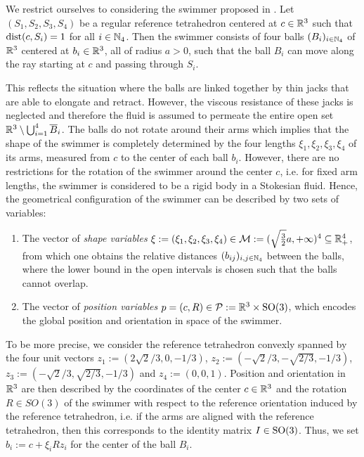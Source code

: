 \label{sec:modeling}
We restrict ourselves to considering the swimmer \spr proposed in \cite{Alouges2013}. Let $(S_1, S_2, S_3, S_4)$ be a regular reference tetrahedron centered at $c \in \mathbb{R}^3$ such that $\operatorname{dist}(c, S_i) = 1$ for all $i \in \mathbb{N}_4$. Then the swimmer consists of four balls $(B_i)_{i \in \mathbb{N}_4}$ of $\mathbb{R}^3$ centered at $b_i \in \mathbb{R}^3$, all of radius $a > 0$, such that the ball $B_i$ can move along the ray starting at $c$ and passing through $S_i$.

 This reflects the situation where the balls are linked together by thin jacks that are able to elongate and retract. However, the viscous resistance of these jacks is neglected and therefore the fluid is assumed to permeate the entire open set $\mathbb{R}^3 \setminus \bigcup_{i = 1}^{4} \overline{B}_i$. The balls do not rotate around their arms which implies that the shape of the swimmer is completely determined by the four lengths $\xi_1, \xi_2, \xi_3, \xi_4$ of its arms, measured from $c$ to the center of each ball $b_i$. However, there are no restrictions for the rotation of the swimmer around the center $c$, i.e. for fixed arm lengths, the swimmer is considered to be a rigid body in a Stokesian fluid.
Hence, the geometrical configuration of the swimmer can be described by two sets of variables:
\begin{enumerate}
	\item The vector of \emph{shape variables} $\xi := (\xi_1, \xi_2, \xi_3, \xi_4) \in \mathcal{M} := (\sqrt{\tfrac{3}{2}}a, +\infty)^4 \subseteq \mathbb{R}_+^4$, from which one obtains the relative distances $(b_{ij})_{i,j \in \mathbb{N}_4}$ between the balls,  where the lower bound in the open intervals is chosen such that the balls cannot overlap.
	\item The vector of \emph{position variables} $p = (c, R) \in \mathcal{P} :=  \mathbb{R}^3 \times \operatorname{SO}(3)$, which encodes the global position and orientation in space of the swimmer.
\end{enumerate}
To be more precise, we consider the reference tetrahedron convexly spanned by the four unit vectors $z_1 := (2 \sqrt{2}/3,0,-1/3)$, $z_2 := (-\sqrt{2}/3,-\sqrt{2/3},-1/3)$, $z_3 := (-\sqrt{2}/3,\sqrt{2/3},-1/3)$ and $z_4 := (0,0,1)$. Position and orientation in $\mathbb{R}^3$ are then described by the coordinates of the center $c \in \mathbb{R}^3$ and the rotation $R \in SO(3)$ of the swimmer with respect to the reference orientation induced by the reference tetrahedron, i.e. if the arms are aligned with the reference tetrahedron, then this corresponds to the identity matrix $I \in \operatorname{SO}(3)$. Thus, we set $b_i := c + \xi_i R z_i$ for the center of the ball $B_i$.


